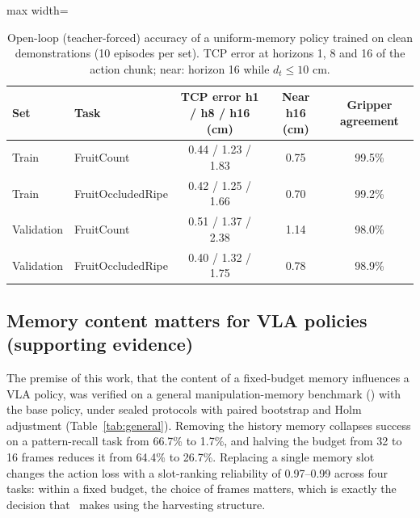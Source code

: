 \begin{table}[t]
\centering
\caption{Open-loop (teacher-forced) accuracy of a uniform-memory policy trained on clean demonstrations (10 episodes per set). TCP error at horizons 1, 8 and 16 of the action chunk; near: horizon 16 while $d_t \le 10$ cm.}
\label{tab:openloop}
\footnotesize
\begin{adjustbox}{max width=\textwidth}\begin{tabular}{llccc}
\toprule
Set & Task & TCP error h1 / h8 / h16 (cm) & Near h16 (cm) & Gripper agreement\\
\midrule
Train & FruitCount & 0.44 / 1.23 / 1.83 & 0.75 & 99.5\%\\
Train & FruitOccludedRipe & 0.42 / 1.25 / 1.66 & 0.70 & 99.2\%\\
Validation & FruitCount & 0.51 / 1.37 / 2.38 & 1.14 & 98.0\%\\
Validation & FruitOccludedRipe & 0.40 / 1.32 / 1.75 & 0.78 & 98.9\%\\
\bottomrule
\end{tabular}\end{adjustbox}
\end{table}

\subsection{Memory content matters for VLA policies (supporting evidence)}
\label{sec:res_general}
The premise of this work, that the content of a fixed-budget memory influences a VLA policy, was verified on a general manipulation-memory benchmark () with the base policy, under sealed protocols with paired bootstrap and Holm adjustment (Table~\ref{tab:general}). Removing the history memory collapses success on a pattern-recall task from 66.7\% to 1.7\%, and halving the budget from 32 to 16 frames reduces it from 64.4\% to 26.7\%. Replacing a single memory slot changes the action loss with a slot-ranking reliability of 0.97--0.99 across four tasks: within a fixed budget, the choice of frames matters, which is exactly the decision that \pekm\ makes using the harvesting structure. 

